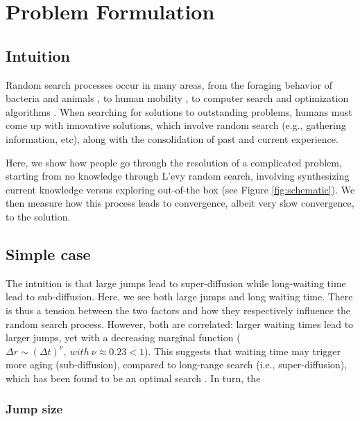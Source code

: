 \section{Problem Formulation}
\subsection{Intuition}

Random search processes occur in many areas, from the foraging behavior
of bacteria and animals \cite{}, to human mobility \cite{}, to computer search and optimization algorithms \cite{}.  When searching for solutions to outstanding problems, humans must come up with innovative solutions, which involve random search (e.g., gathering information, etc), along with the consolidation of past and current experience.

Here, we show how people go through the resolution of a complicated problem, starting from no knowledge through L'evy random search, involving synthesizing current knowledge versus exploring out-of-the box (see Figure \ref{fig:schematic}). We then measure how this process leads to convergence, albeit very slow convergence, to the solution.


\subsection{Simple case}

The intuition is that large jumps lead to super-diffusion while long-waiting time lead to sub-diffusion. Here, we see both large jumps and long waiting time. There is thus a tension between the two factors and how they respectively influence the random search process. However, both are correlated: larger waiting times lead to larger jumps, yet with a decreasing marginal function ($\Delta r \sim {(\Delta t)}^{\nu},~with ~\nu \approx 0.23 < 1$). This suggests that waiting time may trigger more aging (sub-diffusion), compared to long-range search (i.e., super-diffusion), which has been found to be an optimal search \cite{optimal_random_search}. In turn, the




\subsubsection{Jump size}

